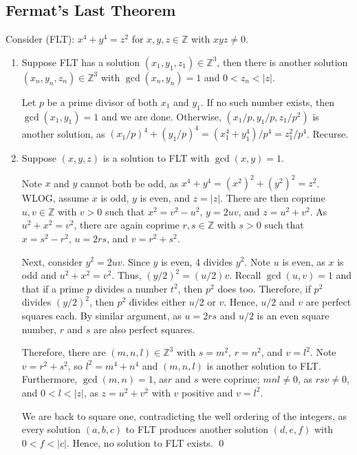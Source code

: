 \documentclass{article}
\newcommand{\Z}{\mathbb{Z}}
\begin{document}
\subsection{Fermat's Last Theorem}
  Consider (FLT): $x^4+y^4=z^2$ for $x,y,z\in\Z$ with $xyz\ne0$.
  \begin{enumerate}[label=\textbf{(\alph*)}]
    \item{
      Suppose FLT has a solution $(x_1,y_1,z_1)\in\Z^3$, then there is another
      solution $(x_n,y_n,z_n)\in\Z^3$ with $\gcd(x_n,y_n)=1$ and $0<z_n<|z|$.

      Let $p$ be a prime divisor of both $x_1$ and $y_1$. If no such number
      exists, then $\gcd(x_1,y_1)=1$ and we are done. Otherwise, $(x_1/p,y_1/p,
      z_1/p^2)$ is another solution, as $(x_1/p)^4+(y_1/p)^4=(x_1^4+y_1^4)/p^4=
      z_1^2/p^4$. Recurse.
    }
    \item{
      Suppose $(x,y,z)$ is a solution to FLT with $\gcd(x,y)=1$.

      Note $x$ and $y$ cannot both be odd, as $x^4+y^4=(x^2)^2+(y^2)^2=z^2$.
      WLOG, assume $x$ is odd, $y$ is even, and $z=|z|$. There are then coprime
      $u,v\in\Z$ with $v>0$ such that $x^2=v^2-u^2$, $y=2uv$, and $z=u^2+v^2$.
      As $u^2+x^2=v^2$, there are again coprime $r,s\in\Z$ with
      $s>0$ such that $x=s^2-r^2$, $u=2rs$, and $v=r^2+s^2$.

      Next, consider $y^2=2uv$. Since $y$ is even, 4 divides $y^2$. Note $u$
      is even, as $x$ is odd and $u^2+x^2=v^2$. Thus, $(y/2)^2=(u/2)v$. Recall
      $\gcd(u,v)=1$ and that if a prime $p$ divides a number $t^2$, then $p^2$
      does too. Therefore, if $p^2$ divides $(y/2)^2$, then $p^2$ divides either
      $u/2$ or $v$. Hence, $u/2$ and $v$ are perfect squares each. By similar
      argument, as $u=2rs$ and $u/2$ is an even square number, $r$ and $s$ are
      also perfect squares.

      Therefore, there are $(m,n,l)\in\Z^3$ with $s=m^2$, $r=n^2$, and $v=l^2$.
      Note $v=r^2+s^2$, so $l^2=m^4+n^4$ and $(m,n,l)$ is another solution to
      FLT. Furthermore, $\gcd(m,n)=1$, as$r$ and $s$ were coprime; $mnl\ne0$, as
      $rsv\ne0$, and $0<l<|z|$, as $z=u^2+v^2$ with $v$ positive and $v=l^2$.

      We are back to square one, contradicting the well ordering of the
      integers, as every solution $(a,b,c)$ to FLT produces another solution
      $(d,e,f)$ with $0<f<|c|$. Hence, no solution to FLT exists.
      \qed
    }
  \end{enumerate}
\end{document}
